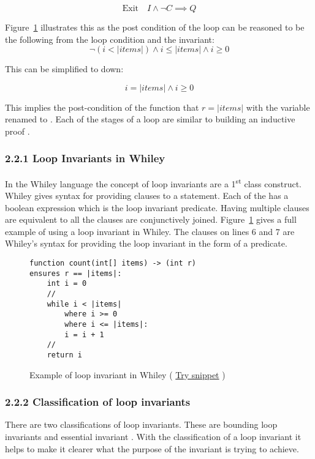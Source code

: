 $$\text{Exit} \quad I \wedge \neg{C} \implies Q$$

Figure~\ref{lst:whiley-inv} illustrates this as the
post condition of the loop can be reasoned to be the following
from the loop condition and the invariant:
$$\neg{ ( i < |items| ) } \wedge i \leq |items| \wedge i \geq 0$$

This can be simplified to down:

$$ i = |items| \wedge i \geq 0$$

This implies the post-condition of the function that $r = |items|$ with
the variable  renamed to .
Each of the stages of a loop are similar to building an inductive proof \cite{invarints-classifiction}.

\subsubsection*{2.2.1 Loop Invariants in Whiley}

In the Whiley language the concept of loop invariants are a 1\textsuperscript{st} class
construct.
Whiley gives syntax for providing  clauses to a 
statement.
Each of the  has a boolean expression which is the loop
invariant predicate.
Having multiple  clauses are equivalent to all the clauses are
conjunctively joined.
Figure~\ref{lst:whiley-inv} gives a full example of using a loop invariant
in Whiley. The  clauses on lines 6 and 7 are Whiley's syntax for
providing the loop invariant in the form of a predicate.

\begin{figure}[ht]
\begin{lstlisting}
function count(int[] items) -> (int r)
ensures r == |items|:
    int i = 0
    //
    while i < |items|
        where i >= 0
        where i <= |items|:
        i = i + 1
    //
    return i
\end{lstlisting}
    \caption{Example of loop invariant in Whiley (
    \href{http://whiley.org/play/?id=DzLm1T}{Try snippet} ) }
    \label{lst:whiley-inv}
\end{figure}

\subsubsection*{2.2.2 Classification of loop invariants}

There are two classifications of loop invariants.
These are bounding loop invariants and essential invariant
\cite{invarints-classifiction}.
With the classification of a loop invariant it helps to make
it clearer what the purpose of the invariant is trying to achieve.

